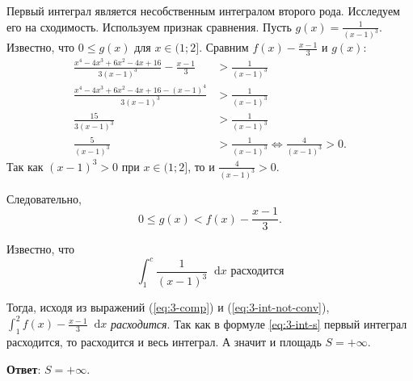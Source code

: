 \documentclass[a4paper,12pt]{article}
\newcommand*\diff{\mathop{}\!\mathrm{d}}
\begin{document}
Первый интеграл является несобственным интегралом второго рода.
Исследуем его на сходимость.
Используем признак сравнения.
Пусть \(g(x) = \frac{1}{{(x - 1)}^3}\).
Известно, что \(0 \le g(x)\) для \(x \in (1; 2]\).
Сравним \(f(x) - \frac{x - 1}{3}\) и \(g(x)\):
\begin{align*}
  \frac{x^4 - 4 x^3 + 6 x^2 - 4 x + 16}{3 {(x - 1)}^3} - \frac{x - 1}{3}
  &> \frac{1}{{(x - 1)}^3} \\
  \frac{x^4 - 4 x^3 + 6 x^2 - 4 x + 16 - {(x - 1)}^4}{3 {(x - 1)}^3}
  &> \frac{1}{{(x - 1)}^3} \\
  \frac{15}{3 {(x - 1)}^3} &> \frac{1}{{(x - 1)}^3} \\
  \frac{5}{{(x - 1)}^3} &> \frac{1}{{(x - 1)}^3} \Leftrightarrow
  \frac{4}{{(x - 1)}^3} > 0.
\end{align*}
Так как \({(x - 1)}^3 > 0\) при \(x \in (1; 2]\),
то и \(\frac{4}{{(x - 1)}^3} > 0\).

Следовательно,
\begin{equation} \label{eq:3-comp}
  0 \le g(x) < f(x) - \frac{x - 1}{3}.
\end{equation}

Известно, что
\begin{equation} \label{eq:3-int-not-conv}
  \int_{1}^{c} \frac{1}{{(x - 1)}^3} \diff x \text{ расходится}
\end{equation}

Тогда, исходя из выражений (\ref{eq:3-comp}) и (\ref{eq:3-int-not-conv}),
\(\int_{1}^{2} f(x) - \frac{x - 1}{3} \diff x\) \textit{расходится}.
Так как в формуле \ref{eq:3-int-s} первый интеграл расходится,
то расходится и весь интеграл.
А значит и площадь \(S = +\infty\).

\textbf{Ответ}: \(S = +\infty\).
\end{document}
